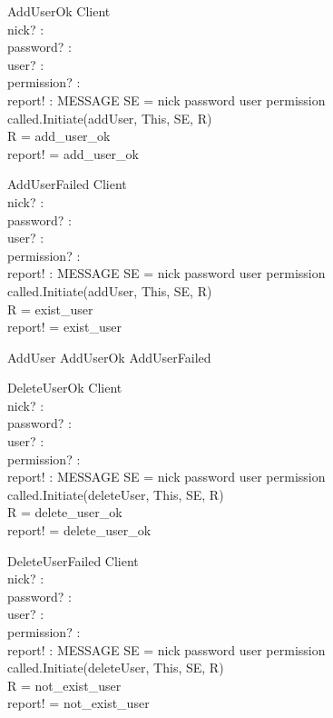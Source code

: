 \begin{schema}{AddUserOk}
\Xi Client \\
nick? : \nat \\
password? : \nat \\
user? : \nat \\
permission? : \nat \\
report! : MESSAGE
\where
SE = \lseq nick password user permission \rseq \\
called.Initiate(addUser, This, SE, R) \\
R = add\_user\_ok \\
report! = add\_user\_ok
\end{schema}

\begin{schema}{AddUserFailed}
\Xi Client \\
nick? : \nat \\
password? : \nat \\
user? : \nat \\
permission? : \nat \\
report! : MESSAGE
\where
SE = \lseq nick password user permission \rseq \\
called.Initiate(addUser, This, SE, R) \\
R = exist\_user \\
report! = exist\_user
\end{schema}

\begin{zed}
AddUser \sdef AddUserOk \lor AddUserFailed \end{zed}


\begin{schema}{DeleteUserOk}
\Xi Client \\
nick? : \nat \\
password? : \nat \\
user? : \nat \\
permission? : \nat \\
report! : MESSAGE
\where 
SE = \lseq nick password user permission \rseq \\
called.Initiate(deleteUser, This, SE, R) \\
R = delete\_user\_ok \\
report! = delete\_user\_ok
\end{schema}

\begin{schema}{DeleteUserFailed}
\Xi Client \\
nick? : \nat \\
password? : \nat \\
user? : \nat \\
permission? : \nat \\
report! : MESSAGE
\where 
SE = \lseq nick password user permission \rseq \\
called.Initiate(deleteUser, This, SE, R) \\
R = not\_exist\_user \\
report! = not\_exist\_user
\end{schema}


